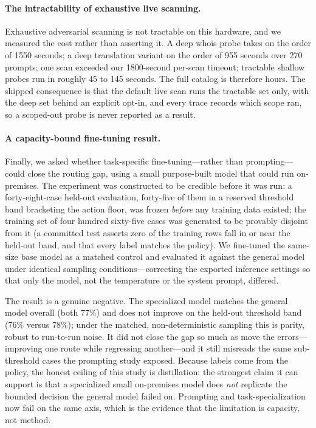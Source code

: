 \documentclass[10pt,twocolumn]{article}
\begin{document}
\paragraph{The intractability of exhaustive live scanning.}
Exhaustive adversarial scanning is not tractable on this hardware, and we measured
the cost rather than asserting it. A deep whois probe takes on the order of 1550
seconds; a deep translation variant on the order of 955 seconds over 270 prompts;
one scan exceeded our 1800-second per-scan timeout; tractable shallow probes run
in roughly 45 to 145 seconds. The full catalog is therefore hours. The shipped
consequence is that the default live scan runs the tractable set only, with the
deep set behind an explicit opt-in, and every trace records which scope ran, so a
scoped-out probe is never reported as a result.

\paragraph{A capacity-bound fine-tuning result.}
Finally, we asked whether task-specific fine-tuning---rather than prompting---could
close the routing gap, using a small purpose-built model that could run
on-premises. The experiment was constructed to be credible before it was run: a
forty-eight-case held-out evaluation, forty-five of them in a reserved threshold
band bracketing the action floor, was frozen \emph{before} any training data
existed; the training set of four hundred sixty-five cases was generated to be
provably disjoint from it (a committed test asserts zero of the training rows fall
in or near the held-out band, and that every label matches the policy). We
fine-tuned the same-size base model as a matched control and evaluated it against
the general model under identical sampling conditions---correcting the exported
inference settings so that only the model, not the temperature or the system
prompt, differed.

The result is a genuine negative. The specialized model matches the general model
overall (both 77\%) and does not improve on the held-out
threshold band (76\% versus 78\%); under the matched,
non-deterministic sampling this is parity, robust to run-to-run noise. It did not
close the gap so much as move the errors---improving one route while regressing
another---and it still misreads the same sub-threshold cases the prompting study
exposed. Because labels come from the policy, the honest ceiling of this study is
distillation: the strongest claim it can support is that a specialized small
on-premises model does \emph{not} replicate the bounded decision the general model
failed on. Prompting and task-specialization now fail on the same axis, which is
the evidence that the limitation is capacity, not method.
\end{document}
